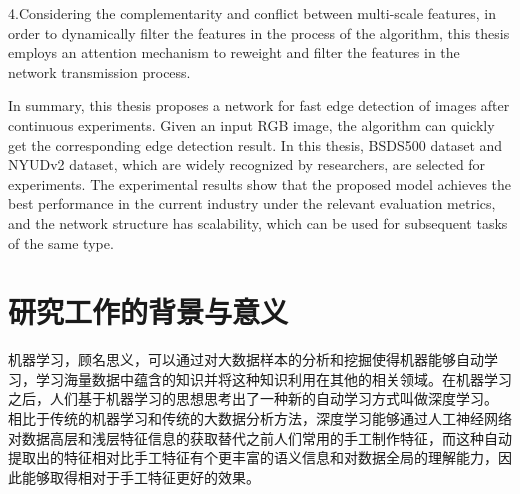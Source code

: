 \documentclass[master]{thesis-uestc}
\begin{document}
\begin{englishabstract}
    4.Considering the complementarity and conflict between multi-scale features, in order to dynamically filter the features in the process of the algorithm, this thesis employs an attention mechanism to reweight and filter the features in the network transmission process.
    
    In summary, this thesis proposes a network for fast edge detection of images after continuous experiments. Given an input RGB image, the algorithm can quickly get the corresponding edge detection result. In this thesis, BSDS500 dataset and NYUDv2 dataset, which are widely recognized by researchers, are selected for experiments. The experimental results show that the proposed model achieves the best performance in the current industry under the relevant evaluation metrics, and the network structure has scalability, which can be used for subsequent tasks of the same type.

\end{englishabstract}

\thesistableofcontents

\thesischapterexordium

\section{研究工作的背景与意义}

机器学习，顾名思义，可以通过对大数据样本的分析和挖掘使得机器能够自动学习，学习海量数据中蕴含的知识并将这种知识利用在其他的相关领域。在机器学习之后，人们基于机器学习的思想思考出了一种新的自动学习方式叫做深度学习。
相比于传统的机器学习和传统的大数据分析方法，深度学习能够通过人工神经网络对数据高层和浅层特征信息的获取替代之前人们常用的手工制作特征，而这种自动提取出的特征相对比手工特征有个更丰富的语义信息和对数据全局的理解能力，因此能够取得相对于手工特征更好的效果。
\end{document}
